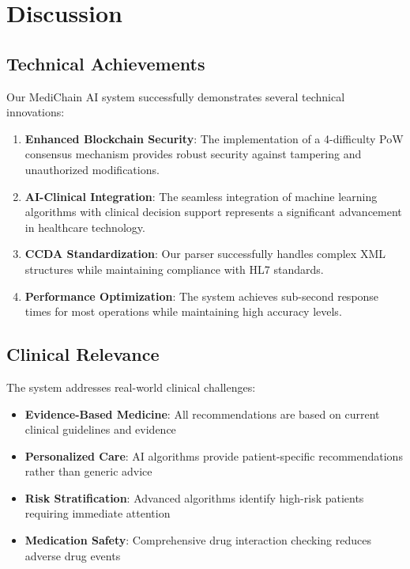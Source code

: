 \documentclass[12pt,a4paper]{article}
\begin{document}
\section{Discussion}

\subsection{Technical Achievements}

Our MediChain AI system successfully demonstrates several technical innovations:

\begin{enumerate}
    \item \textbf{Enhanced Blockchain Security}: The implementation of a 4-difficulty PoW consensus mechanism provides robust security against tampering and unauthorized modifications.
    
    \item \textbf{AI-Clinical Integration}: The seamless integration of machine learning algorithms with clinical decision support represents a significant advancement in healthcare technology.
    
    \item \textbf{CCDA Standardization}: Our parser successfully handles complex XML structures while maintaining compliance with HL7 standards.
    
    \item \textbf{Performance Optimization}: The system achieves sub-second response times for most operations while maintaining high accuracy levels.
\end{enumerate}

\subsection{Clinical Relevance}

The system addresses real-world clinical challenges:
\begin{itemize}
    \item \textbf{Evidence-Based Medicine}: All recommendations are based on current clinical guidelines and evidence
    \item \textbf{Personalized Care}: AI algorithms provide patient-specific recommendations rather than generic advice
    \item \textbf{Risk Stratification}: Advanced algorithms identify high-risk patients requiring immediate attention
    \item \textbf{Medication Safety}: Comprehensive drug interaction checking reduces adverse drug events
\end{itemize}
\end{document}
